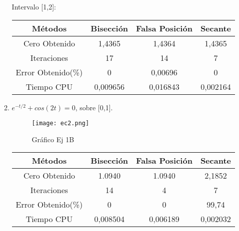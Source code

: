 \documentclass{udpreport}
\begin{document}
\begin{enumerate}
\begin{enumerate}
        \begin{table}[H]Intervalo [1,2]:
        \centering
           \begin{tabular} { |c|c|c|c|}
                \hline
                Métodos       & Bisección & Falsa Posición & Secante  \\
                \hline
                Cero Obtenido &  1,4365       &    1,4364      &      1,4365   \\
                \hline
                Iteraciones   &    17        &    14     &       7        \\
                \hline
                Error Obtenido(\%) &       0      &       0,00696      &     0         \\
                \hline
                Tiempo CPU &       0,009656     &      0,016843    &     0,002164         \\
                 \hline
                \end{tabular}
            \end{table}
    
        
    \item \( e^{-t/2} +cos(2t) = 0 \), sobre [0,1].
    
        \begin{figure}[H]
            \centering
            \texttt{[image: ec2.png]}
            \caption{Gráfico Ej 1B}
        \end{figure}
        
        \begin{table}[H]
        \centering
           \begin{tabular} { |c|c|c|c|}
                \hline
                Métodos       & Bisección & Falsa Posición & Secante  \\
                \hline
                Cero Obtenido &  1.0940      &    1.0940     &      2,1852   \\
                \hline
                Iteraciones   &    14        &    4     &      7        \\
                \hline
                Error Obtenido(\%) &       0      &       0      &     99,74         \\
                \hline
                Tiempo CPU &       0,008504     &      0,006189    &     0,002032         \\
                 \hline
                \end{tabular}
            \end{table}
      

\end{enumerate}
\end{enumerate}
\end{document}
